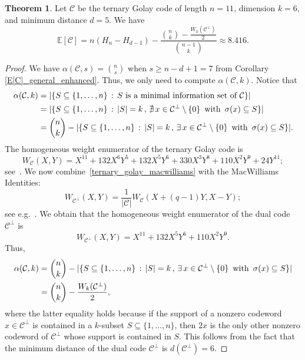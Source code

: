 \documentclass[11pt,a4paper,reqno,twoside]{article}
\theoremstyle{definition}
\newtheorem{theorem}{Theorem}[section]
\newcommand{\E}{\mathbb{E}}
\newcommand{\mC}{\mathcal{C}}
\begin{document}
\begin{theorem} \label{exp_ternary_Golay}
    Let $\mC$ be the ternary Golay code of length $n=11$, dimension $k=6$, and minimum distance $d = 5$. We have
    \[
    \E[\mC] = n(H_n - H_{d-1}) - \frac{\binom{n}{k} - \frac{W_k(\mC^\perp)}{2}}{\binom{n-1}{k}} \approx 8.416.
    \] 
\end{theorem}
\begin{proof}
We have $\alpha(\mC,s) = \binom{n}{s}$ when $s \ge n-d+1 = 7$ from Corollary \ref{E[C]_general_enhanced}. Thus, we only need to compute $ \alpha(\mC,k)$. Notice that
\[
\begin{split}
    \alpha(\mC,k) &= |\{ S \subseteq \{1, \dots, n\} \, : \, S \textnormal{ is a minimal information set of $\mC$}  \}| \\
    &= |\{ S \subseteq \{1, \dots, n\} \, : \, |S| = k \, , \, \nexists \, x \in \mC^\perp \setminus \{0\} \, \textnormal{ with } \, \sigma(x) \subseteq S \}| \\
    &= \binom{n}{k} - |\{ S \subseteq \{1, \dots, n\} \, : \, |S| = k \, , \, \exists \, x \in \mC^\perp \setminus \{0\} \, \textnormal{ with } \, \sigma(x) \subseteq S \}|.
\end{split}
\]
The homogeneous weight enumerator of the ternary Golay code is 
\begin{equation} \label{ternary_golay_macwilliams}
    W_{\mC}(X,Y) = X^{11} + 132 X^6 Y^5 + 132 X^5 Y^6  + 330 X^3Y^8 + 110 X^2 Y^9 + 24 Y^{11};
\end{equation}
see~\cite[Example~7.6.2]{fundamental_err_corr_codes}. We now combine~\eqref{ternary_golay_macwilliams} with the  MacWilliams Identities: 
\[
    W_{\mC^\perp}(X,Y) = \frac{1}{|\mC|} W_{\mC}(X+(q-1)Y,X-Y);
\]
see e.g.~\cite[Chapter~5, Theorem~13]{mds2}.
We obtain that the homogeneous weight enumerator of the dual code~$\mC^{\perp}$ is
\[
W_{\mC^\perp}(X,Y) = X^{11} + 132 X^5 Y^6 + 110 X^2 Y^9.
\] 
Thus, 
\[
\begin{split}
    \alpha(\mC,k) &= \binom{n}{k} - |\{ S \subseteq \{1, \dots, n\} \, : \, |S| = k \, , \, \exists \, x \in \mC^\perp \setminus \{0\} \, \textnormal{ with } \, \sigma(x) \subseteq S \}| \\
    &= \binom{n}{k} - \frac{W_k(\mC^\perp)}{2},
\end{split}
\]
where the latter equality holds because if the support of a nonzero codeword $x \in \mC^\perp$ is contained in a $k$-subset $S \subseteq \{1, \dots, n\}$, then $2x$ is the only other nonzero codeword of $\mC^\perp$ whose support is contained in $S$. This follows from the fact that the minimum distance of the dual code $\mC^\perp$ is $d(\mC^\perp) = 6$. 
\end{proof}
\end{document}
